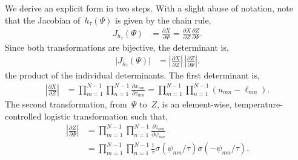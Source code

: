 \documentclass[twoside]{article}
\begin{document}
We derive an explicit form in two steps. With a slight abuse of
notation, note that the Jacobian of~$h_\tau(\Psi)$ is given
by the chain rule,
\begin{align*}
  J_{h_\tau}(\Psi)
  &= \frac{\partial X}{\partial  \Psi}
    = \frac{\partial X}{\partial Z} \frac{\partial Z}{\partial \Psi}.
\end{align*}
Since both transformations are bijective, the determinant is,
\begin{align*}
  \big| J_{h_\tau}(\Psi) \big|
  &= \left| \frac{\partial X}{\partial Z} \right| \,
     \left| \frac{\partial Z}{\partial \Psi} \right|.
\end{align*}
the product
of the individual determinants.  The first determinant is,
\begin{align*}
  \left| \frac{\partial X}{\partial Z} \right|
  &= \prod_{m=1}^{N-1} \prod_{n=1}^{N-1} \frac{\partial x_{mn} }{\partial {z}_{mn}} 
  = \prod_{m=1}^{N-1} \prod_{n=1}^{N-1} (u_{mn} - \ell_{mn}).
\end{align*}
The second transformation, from~$\Psi$ to~$Z$, is an element-wise,
temperature-controlled logistic transformation such that,
\begin{align*}
  \left| \frac{\partial Z}{\partial \Psi} \right| 
  &= \prod_{m=1}^{N-1} \prod_{n=1}^{N-1} \frac{\partial z_{mn}}{\partial \psi_{mn}} \\
  &= \prod_{m=1}^{N-1} \prod_{n=1}^{N-1}
    \frac{1}{\tau} \sigma \left(\psi_{mn} / \tau \right)
    \sigma \left(-\psi_{mn} / \tau \right).
\end{align*}


\end{document}
